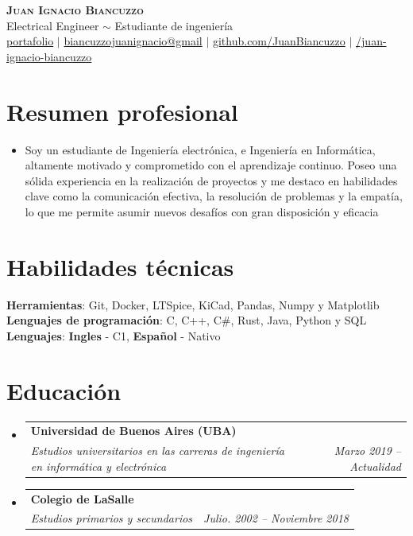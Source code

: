 \documentclass[letterpaper,11pt]{article}
\makeatletter
\newcommand{\resumeSubheading}[4]{
  \vspace{-2pt}\item
    \begin{tabular*}{0.97\textwidth}[t]{l@{\extracolsep{\fill}}r}
      \textbf{#1} & #2 \\
      \textit{\small#3} & \textit{\small #4} \\
    \end{tabular*}\vspace{-7pt}
}
\newcommand{\resumeSubHeadingListStart}{\begin{itemize}[leftmargin=0.15in, label={}]}
\newcommand{\resumeSubHeadingListEnd}{\end{itemize}}
\makeatother
\begin{document}
\begin{center}
    \textbf{\Huge \scshape Juan Ignacio Biancuzzo} \\ \vspace{1pt} 
    { \Large Electrical Engineer $\sim$ Estudiante de ingeniería } \\

    { \small
        \faGlobe \href{https://juanbiancuzzo.github.io/JuanBiancuzzo/}{ portafolio} $|$
        \faEnvelope \href{mailto:biancuzzojuanignacio@gmail.com}{ biancuzzojuanignacio@gmail} $|$
        \faGithub \href{https://github.com/JuanBiancuzzo}{ github.com/JuanBiancuzzo} $|$
        \faLinkedinSquare \href{https://www.linkedin.com/in/juan-ignacio-biancuzzo-367611231/}{/juan-ignacio-biancuzzo}
    }
    
\end{center}

\section{Resumen profesional}
    \resumeSubHeadingListStart
        \vspace{-2pt}\item Soy un estudiante de Ingeniería electrónica, e Ingeniería en Informática, altamente motivado y comprometido con el aprendizaje continuo. Poseo una sólida experiencia en la realización de proyectos y me destaco en habilidades clave como la comunicación efectiva, la resolución de problemas y la empatía, lo que me permite asumir nuevos desafíos con gran disposición y eficacia
    \resumeSubHeadingListEnd

\section{Habilidades técnicas}
 \begin{itemize}[leftmargin=0.15in, label={}]
    \small{\item{
     \textbf{Herramientas}{: Git, Docker, LTSpice, KiCad, Pandas, Numpy y Matplotlib} \\
     \textbf{Lenguajes de programación}{: C, C++, C\#, Rust, Java, Python y SQL} \\
     \textbf{Lenguajes}{: \textbf{Ingles} - C1, \textbf{ Español} - Nativo} \\
    }}
 \end{itemize}

\section{Educación}
  \resumeSubHeadingListStart
    \resumeSubheading
      {Universidad de Buenos Aires (UBA)}{}
      {Estudios universitarios en las carreras de ingeniería en informática y electrónica}{Marzo 2019 -- Actualidad}
    \resumeSubheading
      {Colegio de LaSalle}{}
      {Estudios primarios y secundarios}{Julio. 2002 -- Noviembre 2018}
  \resumeSubHeadingListEnd
\end{document}
